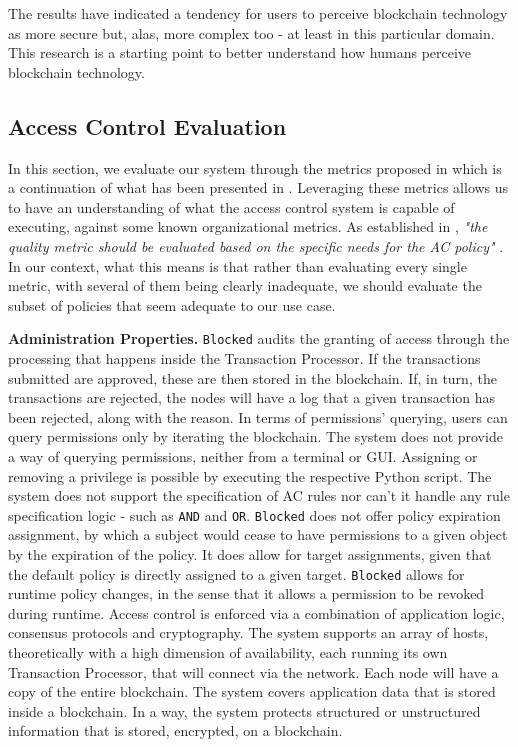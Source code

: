 The results have indicated a tendency for users to perceive blockchain technology as more secure but, alas, more complex too - at least in this particular domain. This research is a starting point to better understand how humans perceive blockchain technology.

\subsection{Access Control Evaluation}
\label{sec:eval-ac}

In this section, we evaluate our system through the metrics proposed in \cite{hu_guidelines_2012} which is a continuation of what has been presented in \cite{hu_assessment_2006}. Leveraging these metrics allows us to have an understanding of what the access control system is capable of executing, against some known organizational metrics. As established in \cite{hu_guidelines_2012}, \emph{"the quality metric should be evaluated based on the specific needs for the AC policy"} \cite[25]{hu_guidelines_2012}. In our context, what this means is that rather than evaluating every single metric, with several of them being clearly inadequate, we should evaluate the subset of policies that seem adequate to our use case.

\textbf{Administration Properties.} \texttt{Blocked} audits the granting of access through the processing that happens inside the Transaction Processor. If the transactions submitted are approved, these are then stored in the blockchain. If, in turn, the transactions are rejected, the nodes will have a log that a given transaction has been rejected, along with the reason. In terms of permissions' querying, users can query permissions only by iterating the blockchain. The system does not provide a way of querying permissions, neither from a terminal or GUI. Assigning or removing a privilege is possible by executing the respective Python script. The system does not support the specification of AC rules nor can't it handle any rule specification logic - such as \texttt{AND} and \texttt{OR}. \texttt{Blocked} does not offer policy expiration assignment, by which a subject would cease to have permissions to a given object by the expiration of the policy. It does allow for target assignments, given that the default policy is directly assigned to a given target. \texttt{Blocked} allows for runtime policy changes, in the sense that it allows a permission to be revoked during runtime. Access control is enforced via a combination of application logic, consensus protocols and cryptography. The system supports an array of hosts, theoretically with a high dimension of availability, each running its own Transaction Processor, that will connect via the network. Each node will have a copy of the entire blockchain. The system covers application data that is stored inside a blockchain. In a way, the system protects structured or unstructured information that is stored, encrypted, on a blockchain.

